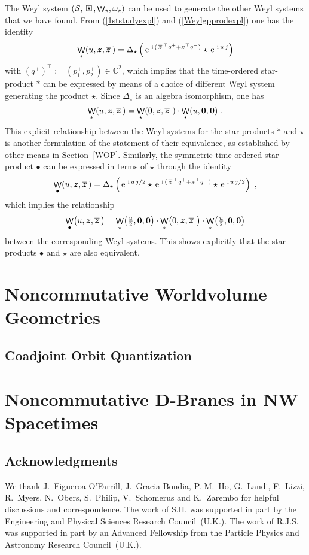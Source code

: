 \documentclass[11pt,a4paper]{article}
\DeclareMathOperator{\weyl}{{\sf W}}                   %
\newcommand{\compc}{\mkern+4mu\square\mkern-17.4mu{\mbox{
    \protect\raisebox{0.2ex}{$\star$}}\mkern+5mu}}      %
\newcommand{\ii}{{\rm i}}
\newcommand{\mbf}[1]{{\boldsymbol {#1} }}
\def\ii{{\,{\rm i}\,}}
\def\mz{{\mbf z}}
\def\mcS{{\mathcal S}}
\newcommand{\newsection}{\setcounter{equation}{0}\section}
\newcommand{\complex}{{\mathbb C}} %
\def\e{{\,\rm e}\,}
\newcommand{\beq}{\begin{eqnarray}}
\newcommand{\eeq}{\end{eqnarray}}
\begin{document}
The Weyl system $(\mcS,\compc,\weyl_\star,\omega_\star)$ can be used
to generate the other Weyl systems that we have found. From
(\ref{1ststudyexpl}) and (\ref{Weylgpprodexpl}) one has the identity
\beq
\weyl_*(u,\mz,\overline{\mz}\,)=\Delta_\star\left(
\e^{\ii(\,\overline{\mz}^{\,\top}q^+
+\mz^\top q^-)}\star\e^{\ii u\,j}\right)
\label{weylTOWeylDelta}\eeq
with $(q^\pm)^\top:=(p_1^\pm,p_2^\pm)\in\complex^2$, which implies
that the time-ordered star-product $*$ can be expressed
by means of a choice of different Weyl system generating the product
$\star$. Since $\Delta_\star$ is an algebra isomorphism, one has
\beq
\weyl_*(u,\mz,\overline{\mz}\,)=\weyl_\star(0,\mz,\overline{\mz}\,\,)
\cdot\weyl_\star(u,\mbf0,\mbf0) \ .
\label{weylTOWeylprods}\eeq
This explicit relationship between the Weyl systems for the
star-products $*$ and $\star$ is another formulation of the statement
of their equivalence, as established by other means in
Section~\ref{WOP}. Similarly, the symmetric time-ordered star-product
$\bullet$ can be expressed in terms of $\star$ through the identity
\beq
\weyl_\bullet(u,\mz,\overline{\mz}\,)=\Delta_\star\left(
\e^{\ii u\,j/2}\star\e^{\ii(\,\overline{\mz}^{\,\top}q^+
+\mz^\top q^-)}\star\e^{\ii u\,j/2}\right) \ ,
\label{WeylTOsymWeylDelta}\eeq
which implies the relationship
\beq
\weyl_\bullet\bigl(u,\mz,\overline{\mz}\,\bigr)=\weyl_\star
\bigl(\mbox{$\frac u2$}
,\mbf0,\mbf0\bigr)\cdot\weyl_\star\bigl(0,\mz,\overline{\mz}\,\,\bigr)
\cdot\weyl_\star\bigl(\mbox{$\frac u2$},\mbf0,\mbf0\bigr)
\label{WeylTOsymWeylprods}\eeq
between the corresponding Weyl systems. This shows explicitly that the
star-products $\bullet$ and $\star$ are also equivalent.

\newsection{Noncommutative Worldvolume Geometries\label{NCWG}}

\subsection{Coadjoint Orbit Quantization\label{DiscrNCGGWS}}

\newsection{Noncommutative D-Branes in NW Spacetimes\label{NCD-BNWS}}

\subsection*{Acknowledgments}

We thank J.~Figueroa-O'Farrill, J.~Gracia-Bondia, P.-M.~Ho, G.~Landi,
F.~Lizzi, R.~Myers, N.~Obers, S.~Philip, V.~Schomerus and K.~Zarembo
for helpful discussions and correspondence. The work of S.H. was
supported in part by the Engineering and Physical Sciences Research
Council~(U.K.). The work of R.J.S. was supported in part by an
Advanced Fellowship from the Particle Physics and Astronomy Research
Council~(U.K.).
\end{document}
